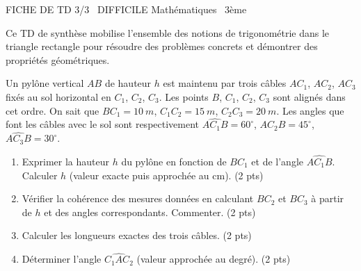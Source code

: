 \documentclass[11pt]{article}
\begin{document}
\begin{tcolorbox}[enhanced,colback=popink,colframe=popink,arc=10pt,boxrule=0pt,left=12pt,right=12pt,top=9pt,bottom=9pt]
{\color{white}\popxbold\small FICHE DE TD 3/3 \textbullet\ DIFFICILE \hfill Mathématiques \textbullet\ 3ème\par}
\end{tcolorbox}
\vspace{4pt}
Ce TD de synthèse mobilise l'ensemble des notions de trigonométrie dans le triangle rectangle pour résoudre des problèmes concrets et démontrer des propriétés géométriques.

\begin{exercice}
Un pylône vertical $AB$ de hauteur $h$ est maintenu par trois câbles $AC_1$, $AC_2$, $AC_3$ fixés au sol horizontal en $C_1$, $C_2$, $C_3$. Les points $B$, $C_1$, $C_2$, $C_3$ sont alignés dans cet ordre. On sait que $BC_1 = \SI{10}{m}$, $C_1C_2 = \SI{15}{m}$, $C_2C_3 = \SI{20}{m}$. Les angles que font les câbles avec le sol sont respectivement $\widehat{AC_1B} = 60^\circ$, $\widehat{AC_2B} = 45^\circ$, $\widehat{AC_3B} = 30^\circ$.
\begin{enumerate}
    \item Exprimer la hauteur $h$ du pylône en fonction de $BC_1$ et de l'angle $\widehat{AC_1B}$. Calculer $h$ (valeur exacte puis approchée au cm). (2 pts)
    \item Vérifier la cohérence des mesures données en calculant $BC_2$ et $BC_3$ à partir de $h$ et des angles correspondants. Commenter. (2 pts)
    \item Calculer les longueurs exactes des trois câbles. (2 pts)
    \item Déterminer l'angle $\widehat{C_1AC_2}$ (valeur approchée au degré). (2 pts)
\end{enumerate}
\end{exercice}
\end{document}

